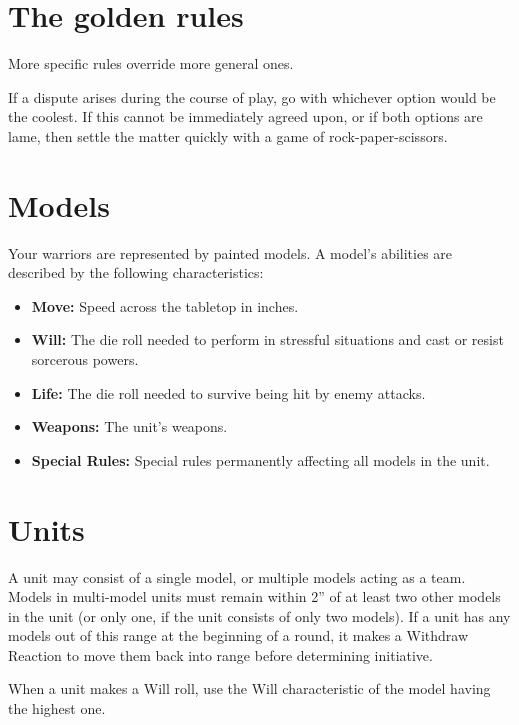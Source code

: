 \begin{multicols}{2}
\section*{The golden rules}

More specific rules override more general ones.

If a dispute arises during the course of play, go with whichever option would be the coolest. If this cannot be immediately agreed upon, or if both options are lame, then settle the matter quickly with a game of rock-paper-scissors.




\section*{Models}

Your warriors are represented by painted models. A model's abilities are described by the following characteristics:
\begin{itemize}
    \item \textbf{Move:} Speed across the tabletop in inches.
    \item \textbf{Will:} The die roll needed to perform in stressful situations and cast or resist sorcerous powers.
    \item \textbf{Life:} The die roll needed to survive being hit by enemy attacks.
    \item \textbf{Weapons:} The unit's weapons.
    \item \textbf{Special Rules:} Special rules permanently affecting all models in the unit.
\end{itemize}





\section*{Units}

A unit may consist of a single model, or multiple models acting as a team. Models in multi-model units must remain within 2'' of at least two other models in the unit (or only one, if the unit consists of only two models). If a unit has any models out of this range at the beginning of a round, it makes a Withdraw Reaction to move them back into range before determining initiative.

When a unit makes a Will roll, use the Will characteristic of the model having the highest one.


\end{multicols}
